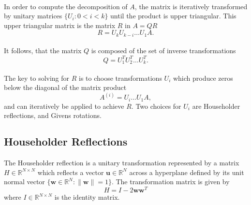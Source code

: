 \documentclass{article}
\begin{document}
\paragraph{}
In order to compute the decomposition of $A$, the matrix is iteratively transformed by unitary matrices $\{U_i : 0 < i < k\}$ until the product is upper triangular. This upper triangular matrix is the matrix $R$ in $A = QR$
\begin{equation}
	\label{eqn:r}
R = U_kU_{k-i} \dots U_1A.
\end{equation}
\paragraph{}
It follows, that the matrix $Q$ is composed of the set of inverse transformations
\begin{equation}
	\label{eqn:q}
Q = U_{1}^{T}U_{2}^{T} \dots U_{k}^{T}.
\end{equation}
\paragraph{}
The key to solving for $R$ is to choose transformations $U_i$ which produce zeros below the diagonal of the matrix product
\begin{equation}
	\label{eqn:update}
A^{(i)} = U_{i} \dots U_1A,
\end{equation}
and can iteratively be applied to achieve $R$. Two choices for $U_i$ are Householder reflections, and Givens rotations.

\subsection{Householder Reflections}
\paragraph{}
The Householder reflection is a unitary transformation represented by a matrix $H\in\mathbb{R}^{N\times{}N}$ which reflects a vector $\mathbf{u}\in\mathbb{R}^N$ across a hyperplane defined by its unit normal vector $\{\mathbf{w}\in\mathbb{R}^N: \|\mathbf{w}\|=1\}$. The transformation matrix is given by
\begin{equation}
	\label{eqn:Householder}
H = I - 2\mathbf{ww}^T
\end{equation}
where $I\in\mathbb{R}^{N\times{}N}$ is the identity matrix. \cite{bhaskar86householder} \cite{lambers21}
\end{document}
